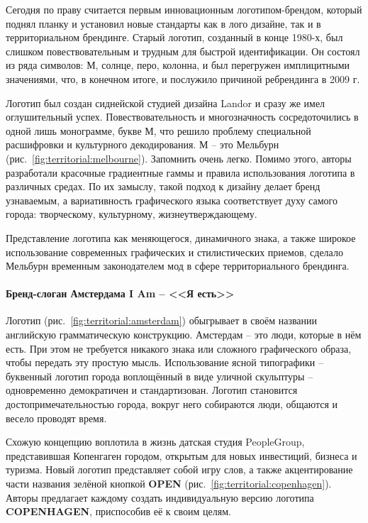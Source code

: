 Сегодня по праву считается первым инновационным логотипом-брендом, который поднял планку и установил
новые стандарты  как в лого дизайне, так и в территориальном брендинге. Старый логотип, созданный в
конце 1980-х, был слишком повествовательным и трудным для быстрой идентификации. Он состоял из ряда
символов: М, солнце, перо, колонна, и был перегружен имплицитными значениями, что, в конечном итоге,
и послужило причиной ребрендинга в 2009 г.

Логотип был создан сиднейской студией дизайна  Landor  и сразу же имел оглушительный
успех. Повествовательность и многозначность сосредоточились в одной лишь монограмме, букве М, что
решило проблему специальной расшифровки и культурного декодирования. М -- это Мельбурн
(рис.~\ref{fig:territorial:melbourne}). Запомнить очень легко. Помимо этого, авторы разработали
красочные градиентные гаммы и правила использования логотипа в различных средах. По их замыслу,
такой подход к дизайну делает бренд узнаваемым, а вариативность графического языка соответствует
духу самого города: творческому, культурному, жизнеутверждающему.

Представление логотипа как меняющегося, динамичного знака, а также широкое использование современных
графических и стилистических приемов, сделало Мельбурн временным законодателем мод в сфере
территориального брендинга.

\paragraph{Бренд-слоган Амстердама I Am -- <<Я есть>>}

Логотип (рис.~\ref{fig:territorial:amsterdam}) обыгрывает в своём названии английскую грамматическую
конструкцию.  Амстердам -- это люди, которые в нём есть. При этом не требуется никакого знака или
сложного графического образа, чтобы передать эту простую мысль. Использование ясной типографики --
буквенный логотип города воплощённый в виде уличной скульптуры -- одновременно демократичен и
стандартизован. Логотип становится достопримечательностью города, вокруг него собираются люди,
общаются и весело проводят время.

Схожую концепцию воплотила в жизнь датская студия PeopleGroup, представившая Копенгаген городом,
открытым для новых инвестиций, бизнеса и туризма. Новый логотип представляет собой игру слов, а
также акцентирование части названия зелёной кнопкой \textbf{OPEN}
(рис.~\ref{fig:territorial:copenhagen}). Авторы предлагает каждому создать
индивидуальную версию логотипа \textbf{COPENHAGEN}, приспособив её к своим целям.

